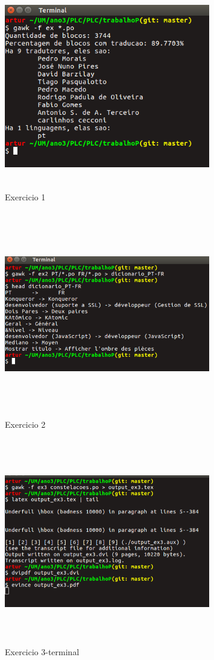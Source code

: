 \documentclass{report}
\begin{document}
\begin{figure}[h]
\center
\includegraphics [width=9cm,height= 9cm]{exercicio1.png}
\caption{Exercicio 1}
\label{figura:Exercicio 1}
\end{figure}

\begin{figure}[h]
\centering
\includegraphics[width=9cm,height= 9cm]{exercicio2.png}
\caption{Exercicio 2}
\label{Exercicio 2}
\end{figure}

\begin{figure}[h]
\centering
\includegraphics[width=9cm,height= 9cm]{exercicio31.png}
\caption{Exercicio 3-terminal}
\label{Exercicio 3}
\end{figure}
\end{document}
